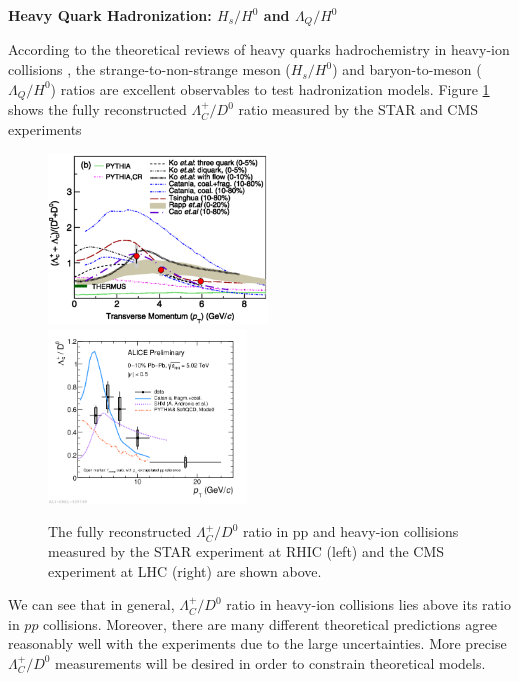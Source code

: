 \textbf{Heavy Quark Hadronization: $H_s/H^0$ and $\Lambda_{Q}/H^{0}$}

According to the theoretical reviews of heavy quarks hadrochemistry in heavy-ion collisions \cite{StrangetoLight,BaryontoMeson}, the strange-to-non-strange meson ($H_s/H^0$) and baryon-to-meson ($\Lambda_{Q}/H^{0}$) ratios are excellent observables to test hadronization models. Figure \ref{HadroPlotCharm} shows the fully reconstructed $\Lambda_C^+/D^0$ ratio measured by the STAR and CMS experiments

\begin{figure}[hbtp]
\begin{center}
\includegraphics[width=0.52\textwidth]{Figures/Chapter1/STARLambdaCD0.png}
\includegraphics[width=0.47\textwidth]{Figures/Chapter1/ALICELambdaCD0}
\caption{The fully reconstructed $\Lambda_C^+/D^0$ ratio in pp and heavy-ion collisions measured by the STAR experiment at RHIC (left) and the CMS experiment at LHC (right) are shown above.}
\label{HadroPlotCharm}
\end{center}
\end{figure}   

We can see that in general, $\Lambda_C^+/D^0$ ratio in heavy-ion collisions lies above its ratio in $pp$ collisions. Moreover, there are many different theoretical predictions agree reasonably well with the experiments due to the large uncertainties. More precise $\Lambda_C^+/D^0$ measurements will be desired in order to constrain theoretical models.

